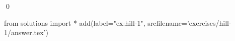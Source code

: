 
\begin{ex} 
  \label{ex:hill-1}
  
  \qed
\end{ex} 
\begin{python0}
from solutions import *
add(label="ex:hill-1",
    srcfilename='exercises/hill-1/answer.tex') 
\end{python0}
